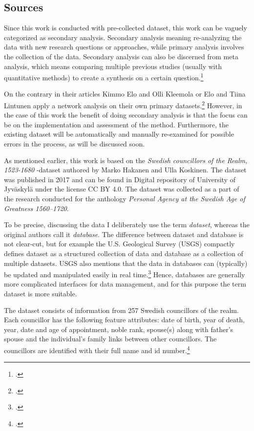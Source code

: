 \subsection{Sources}
\label{sources}
Since this work is conducted with pre-collected dataset, this work can be vaguely categorized as secondary analysis. Secondary analysis meaning re-analyzing the data with new research questions or approaches, while primary analysis involves the collection of the data. Secondary analysis can also be discerned from meta analysis, which means comparing multiple previous studies (usually with quantitative methods) to create a synthesis on a certain question.\footcite[pp. 4-5.]{meta-analysis} 

On the contrary in their articles Kimmo Elo and Olli Kleemola or Elo and Tiina Lintunen apply a network analysis on their own primary datasets.\footcites{eloAklee15}{LintunenAndElo2019} However, in the case of this work the benefit of doing secondary analysis is that the focus can be on the implementation and assessment of the method. Furthermore, the existing dataset will be automatically and manually re-examined for possible errors in the process, as will be discussed soon. 

As mentioned earlier, this work is based on the \textit{Swedish councillors of the Realm, 1523-1680} -dataset authored by Marko Hakanen and Ulla Koskinen. The dataset was published in 2017 and can be found in Digital repository of University of Jyväskylä under the license CC BY 4.0. The dataset was collected as a part of the research conducted for the anthology \textit{Personal Agency at the Swedish Age of Greatness 1560–1720}.

To be precise, discussing the data I deliberately use the term \textit{dataset}, whereas the original authors call it \textit{database}. The difference between dataset and database is not clear-cut, but for example the U.S. Geological Survey (USGS) compactly defines dataset as a structured collection of data and database as a collection of multiple datasets. USGS also mentions that the data in databases can (typically) be updated and manipulated easily in real time.\footcite{usgs} Hence, databases are generally more complicated interfaces for data management, and for this purpose the term dataset is more suitable.

The dataset consists of information from 257 Swedish councillors of the realm. Each councillor has the following feature attributes: date of birth, year of death, year, date and age of appointment, noble rank, spouse(s) along with father's spouse and the individual's family links between other councillors. The councillors are identified with their full name and id number.\footcites[p. 48.]{HakanenAKoskinen2017}{councillorsDS}

